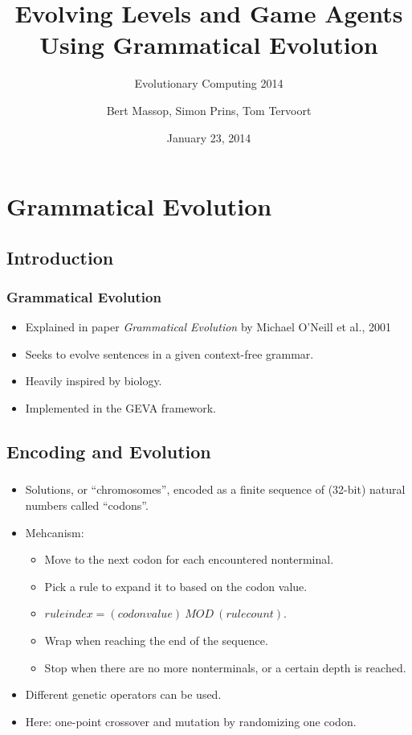\documentclass{beamer}
\title{Evolving Levels and Game Agents Using Grammatical Evolution}
\subtitle{Evolutionary Computing 2014}
\author{Bert Massop, Simon Prins, Tom Tervoort}
\date{January 23, 2014}
\makeatletter
\newcommand*{\currentname}{\@currentlabelname}
\makeatother
\begin{document}
\begin{frame}
\titlepage
\end{frame}

\section{Grammatical Evolution}
\subsection{Introduction}
\begin{frame}
\frametitle{Grammatical Evolution}
\begin{itemize}
\item Explained in paper \textit{Grammatical Evolution} by Michael O'Neill et al., 2001 \cite{o2001grammatical}
\item Seeks to evolve sentences in a given context-free grammar.
\item Heavily inspired by biology.
\item Implemented in the GEVA framework.
\end{itemize}
\end{frame}

\subsection{Encoding and Evolution}
\begin{frame}
\frametitle{\currentname}
\begin{itemize}
\item Solutions, or ``chromosomes'', encoded as a finite sequence of (32-bit) natural numbers called ``codons''.
\item Mehcanism:
\begin{itemize}
	\item Move to the next codon for each encountered nonterminal.
	\item Pick a rule to expand it to based on the codon value.
	\item $rule index = (codon value)\ MOD\ (rule count)$.
	\item Wrap when reaching the end of the sequence.
	\item Stop when there are no more nonterminals, or a certain depth is reached.
\end{itemize}
\end{itemize}
\begin{itemize}
	\item Different genetic operators can be used.
	\item Here: one-point crossover and mutation by randomizing one codon.
\end{itemize}

\end{frame}
\end{document}
